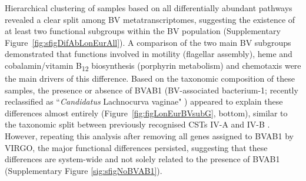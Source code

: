 \documentclass[sn-mathphys,Numbered]{sn-jnl}%
\begin{document}
Hierarchical clustering of samples based on all differentially abundant pathways revealed a clear split among BV metatranscriptomes, suggesting the existence of at least two functional subgroups within the BV population (Supplementary Figure~\ref{fig:sfigDifAbLonEurAll}). A comparison of the two main BV subgroups demonstrated that functions involved in motility (flagellar assembly), heme and cobalamin/vitamin B\textsubscript{12} biosynthesis (porphyrin metabolism) and chemotaxis were the main drivers of this difference. Based on the taxonomic composition of these samples, the presence or absence of BVAB1 (BV-associated bacterium-1; recently reclassified as ``\textit{Candidatus} Lachnocurva vaginae" \citep{holm_comparative_2020}) appeared to explain these differences almost entirely (Figure~\ref{fig:figLonEurBVsubG}, bottom), similar to the taxonomic split between previously recognised CSTs IV-A and IV-B \citep{france_valencia_2020}. However, repeating this analysis after removing all genes assigned to BVAB1 by VIRGO, the major functional differences persisted, suggesting that these differences are system-wide and not solely related to the presence of BVAB1 (Supplementary Figure \ref{sig:sfigNoBVAB1}).
\end{document}
